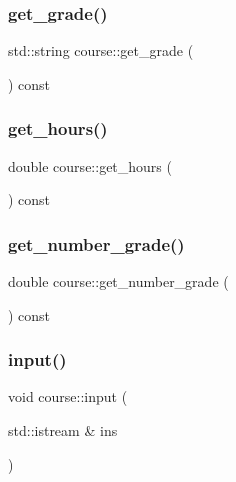 \subsubsection{\texorpdfstring{get\+\_\+grade()}{get\_grade()}}
{\footnotesize\ttfamily std\+::string course\+::get\+\_\+grade (\begin{DoxyParamCaption}{ }\end{DoxyParamCaption}) const\hspace{0.3cm}{\ttfamily [inline]}}

\hypertarget{classcourse_a09f7b2b40cbbb81c94e0642d5b13663e}{}\label{classcourse_a09f7b2b40cbbb81c94e0642d5b13663e} 
\subsubsection{\texorpdfstring{get\+\_\+hours()}{get\_hours()}}
{\footnotesize\ttfamily double course\+::get\+\_\+hours (\begin{DoxyParamCaption}{ }\end{DoxyParamCaption}) const\hspace{0.3cm}{\ttfamily [inline]}}

\hypertarget{classcourse_aad43a6b7ce264bd4038472fc3e40cf16}{}\label{classcourse_aad43a6b7ce264bd4038472fc3e40cf16} 
\subsubsection{\texorpdfstring{get\+\_\+number\+\_\+grade()}{get\_number\_grade()}}
{\footnotesize\ttfamily double course\+::get\+\_\+number\+\_\+grade (\begin{DoxyParamCaption}{ }\end{DoxyParamCaption}) const}

\hypertarget{classcourse_a0a8839f2369903101399bca60547aed2}{}\label{classcourse_a0a8839f2369903101399bca60547aed2} 
\subsubsection{\texorpdfstring{input()}{input()}}
{\footnotesize\ttfamily void course\+::input (\begin{DoxyParamCaption}\item[{std\+::istream \&}]{ins }\end{DoxyParamCaption})}

